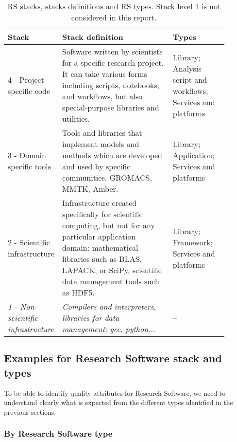 \begin{table}[h]
    \centering
    \scriptsize
    \begin{tabular}[t]{|p{0.15\linewidth}|p{0.5\linewidth}|p{0.25\linewidth}|} \hline

    \textbf{Stack} & \textbf{Stack definition} & \textbf{Types} \\ \hline \hline
    4 - Project specific code &
    Software written by scientists for a specific research project. It can take various forms including scripts, notebooks, and workflows, but also special-purpose libraries and utilities. &
    Library; Analysis script and workflows; Services and platforms \\ \hline

    3 - Domain specific tools &
    Tools and libraries that implement models and methods which are developed and used by specific communities. GROMACS, MMTK, Amber. &
    Library; Application; Services and platforms \\ \hline

    2 - Scientific infrastructure &
    Infrastructure created specifically for scientific computing, but not for any particular application domain: mathematical libraries such as BLAS, LAPACK, or SciPy, scientific data management tools such as HDF5. &
    Library; Framework; Services and platforms\\ \hline

    \it{1 - Non-scientific infrastructure} &
    \it{Compilers and interpreters, libraries for data management; gcc, python...} &
    -- \\ \hline

    \end{tabular}
    \caption{RS stacks, stacks definitions and RS types. Stack level 1 is not considered in this report.}
    \label{tab:rs_stacks}
\end{table}

\subsection{Examples for Research Software stack and types}

To be able to identify quality attributes for Research Software, we need to understand clearly what is expected from the different types identified in the previous sections.

\subsubsection{By Research Software type}

